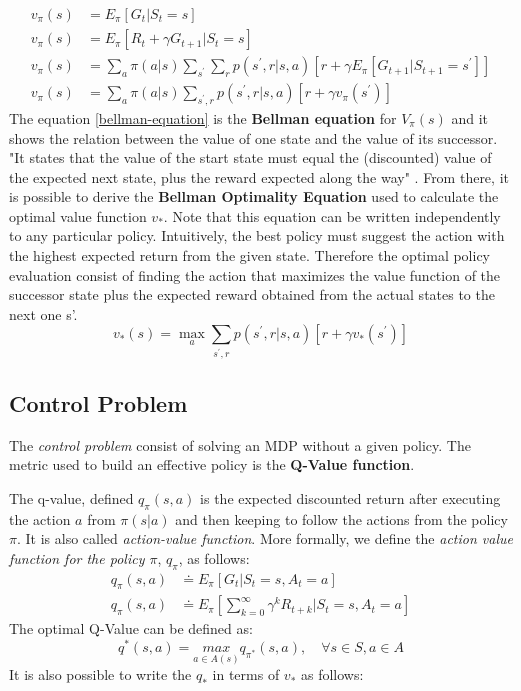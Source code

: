 \begin{align}
    v_\pi(s) &= E_\pi \left [ G_t | S_t = s \right ] \\
    v_\pi(s) &= E_\pi \left [ R_{t} + \gamma G_{t+1} | S_t = s \right ] \\
    v_\pi(s) &= \sum_{a}\pi(a|s)\sum_{s^{'}}\sum_{r}p(s^{'},r|s,a)\left [ r + \gamma E_\pi \left [ G_{t+1} | S_{t+1} = s^{'} \right ] \right ] \\
    \label{bellman-equation}
    v_\pi(s) &= \sum_{a}\pi(a|s)\sum_{s^{'},r}p(s^{'},r|s,a) \left [ r + \gamma v_\pi(s^{'})  \right ]
\end{align}
The equation \ref{bellman-equation} is the \textbf{Bellman equation} for $V_{\pi}(s)$ and it shows the relation between the value of one state and the value of its successor. 
"It states that the value of the start state must equal the (discounted) value of the expected next state, plus the reward expected along the way" \cite{bib:2018Sutton_RLBook}.
From there, it is possible to derive the \textbf{Bellman Optimality Equation} used to calculate the optimal value function $v_*$. 
Note that this equation can be written independently to any particular policy.
Intuitively, the best policy must suggest the action with the highest expected return from the given state.
Therefore the optimal policy evaluation consist of finding the action that maximizes the value function of the successor state plus the expected reward obtained from the actual states to the next one s'.
\begin{equation*}
v_*(s) = \underset{a}{\max} \sum_{s^{'},r}p(s^{'},r|s,a) \left [ r + \gamma v_*(s^{'})  \right ]
\end{equation*}


\subsection{Control Problem}
The \emph{control problem} consist of solving an MDP without a given policy.
The metric used to build an effective policy is the \textbf{Q-Value function}.

The q-value, defined $q_\pi(s,a)$ is the expected discounted return after executing the action $a$ from $\pi(s|a)$ and then keeping to follow the actions from the policy $\pi$. 
It is also called \textit{action-value function}. 
More formally, we define the \textit{action value function for the policy $\pi$}, $q_\pi$, as follows:
\begin{align}
\label{q-value}
q_\pi(s,a) &\doteq  E_\pi \left[ G_t | S_t=s, A_t = a \right] \\
q_\pi(s,a) &\doteq E_\pi \left[ \sum_{k=0}^{\infty}\gamma^k R_{t+k} | S_t = s, A_t = a \right] 
\end{align}
The optimal Q-Value can be defined as:
\begin{equation*}
q^*(s,a) =  \underset{a\in A(s)}{max} q_{\pi^{*}}(s,a),	\quad\forall  s \in S, a \in A
\end{equation*}
It is also possible to write the $q_*$ in terms of $v_*$ as follows:


